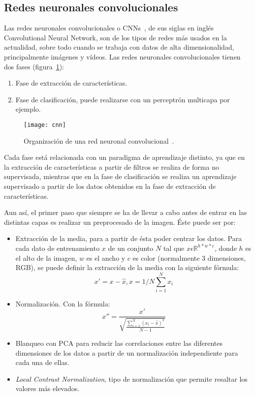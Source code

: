 \subsection{Redes neuronales convolucionales}
Las redes neuronales convolucionales o CNNs~\cite{cnn}, de sus siglas en inglés Convolutional Neural Network, son de los tipos de redes más usados en la actualidad, sobre todo cuando se trabaja con datos de alta dimensionalidad, principalmente imágenes y vídeos. Las redes neuronales convolucionales tienen dos fases (figura~\ref{fig:cnn}):
\begin{enumerate}
	\item Fase de extracción de características.
	\item Fase de clasificación, puede realizarse con un perceptrón multicapa por ejemplo.
\end{enumerate}

\begin{figure}[h]
	\centering
	\texttt{[image: cnn]}
	\caption{Organización de una red neuronal convolucional~\cite{cnn}.}
	\label{fig:cnn}
\end{figure}

Cada fase está relacionada con un paradigma de aprendizaje distinto, ya que en la extracción de características a partir de filtros se realiza de forma no supervisada, mientras que en la fase de clasificación se realiza un aprendizaje supervisado a partir de los datos obtenidos en la fase de extracción de características.


Aun así, el primer paso que siempre se ha de llevar a cabo antes de entrar en las distintas capas es realizar un preprocesado de la imagen. Éste puede ser por:
\begin{itemize}
	\item Extracción de la media, para a partir de ésta poder centrar los datos. Para cada dato de entrenamiento $x$ de un conjunto $N$ tal que $x \epsilon \mathbb{R}^{h*w*c}$, donde $h$ es el alto de la imagen, $w$ es el ancho y $c$ es color (normalmente 3 dimensiones, RGB), se puede definir la extracción de la media con la siguiente fórmula:
	\begin{equation}
	x'=x-\widehat{x}, \widehat{x}=1/N\sum_{i=1}^{N}x_i
	\end{equation}
	\item Normalización. Con la fórmula:
	\begin{equation}
	x''=\frac{x'}{\sqrt{\frac{\sum_{i=1}^{N}(x_i-\widehat{x})^2}{N-1}}}
	\end{equation}
	\item Blanqueo con PCA para reducir las correlaciones entre las diferentes dimensiones de los datos a partir de un normalización independiente para cada una de ellas.
	\item \textit{Local Contrast Normalization}, tipo de normalización que permite resaltar los valores más elevados.
\end{itemize}

